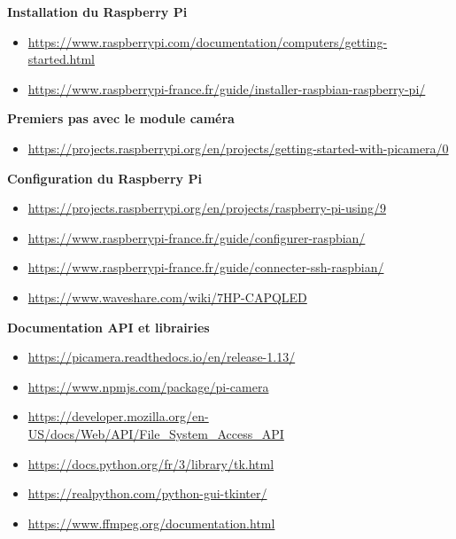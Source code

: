 \renewcommand\bibname{Webographie}
\begin{thebibliography}{9}
    \textbf{Installation du Raspberry Pi}
    \begin{itemize}
        \item \footnotesize{\url{https://www.raspberrypi.com/documentation/computers/getting-started.html}}
        \item \footnotesize{\url{https://www.raspberrypi-france.fr/guide/installer-raspbian-raspberry-pi/}}
    \end{itemize}

    \textbf{Premiers pas avec le module caméra}
    \begin{itemize}
        \item \footnotesize{\url{https://projects.raspberrypi.org/en/projects/getting-started-with-picamera/0}}
    \end{itemize}

    \textbf{Configuration du Raspberry Pi}
    \begin{itemize}
        \item \footnotesize{\url{https://projects.raspberrypi.org/en/projects/raspberry-pi-using/9}}
        \item \footnotesize{\url{https://www.raspberrypi-france.fr/guide/configurer-raspbian/}}
        \item \footnotesize{\url{https://www.raspberrypi-france.fr/guide/connecter-ssh-raspbian/}}
        \item \footnotesize{\url{https://www.waveshare.com/wiki/7HP-CAPQLED}}
    \end{itemize}    

    \textbf{Documentation API et librairies}
    \begin{itemize}
        \item \footnotesize{\url{https://picamera.readthedocs.io/en/release-1.13/}}
        \item \footnotesize{\url{https://www.npmjs.com/package/pi-camera}}
        \item \footnotesize{\url{https://developer.mozilla.org/en-US/docs/Web/API/File_System_Access_API}}
        \item \footnotesize{\url{https://docs.python.org/fr/3/library/tk.html}}
        \item \footnotesize{\url{https://realpython.com/python-gui-tkinter/}}
        \item \footnotesize{\url{https://www.ffmpeg.org/documentation.html}}
    \end{itemize}


\end{thebibliography}
